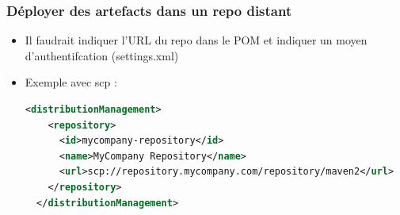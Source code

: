 \documentclass{beamer}
\begin{document}
\begin{frame}[fragile]
  \frametitle{Déployer des artefacts dans un repo distant}
  
  \begin{itemize}
  \item Il faudrait indiquer l'URL du repo dans le POM et indiquer un
    moyen d'authentifcation (settings.xml)
  \item Exemple avec scp :
\begin{lstlisting}[language=XML,basicstyle=\tiny]  
  <distributionManagement>
    <repository>
      <id>mycompany-repository</id>
      <name>MyCompany Repository</name>
      <url>scp://repository.mycompany.com/repository/maven2</url>
    </repository>
  </distributionManagement>
\end{lstlisting}    
\vspace{4cm}
  \end{itemize}
\end{frame}
\end{document}
